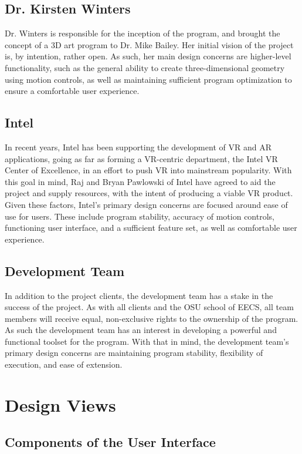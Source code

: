 \documentclass[onecolumn, draftclsnofoot,10pt, compsoc]{IEEEtran}
\begin{document}
\subsection{Dr. Kirsten Winters}
Dr. Winters is responsible for the inception of the program, and brought the concept of a 3D art program to Dr. Mike Bailey. Her initial vision of the project is, by intention, rather open. As such, her main design concerns are higher-level functionality, such as the general ability to create three-dimensional geometry using motion controls, as well as maintaining sufficient program optimization to ensure a comfortable user experience.
\subsection{Intel}
In recent years, Intel has been supporting the development of VR and AR applications, going as far as forming a VR-centric department, the Intel VR Center of Excellence, in an effort to push VR into mainstream popularity. With this goal in mind, Raj and Bryan Pawlowski of Intel have agreed to aid the project and supply resources, with the intent of producing a viable VR product. Given these factors, Intel’s primary design concerns are focused around ease of use for users. These include program stability, accuracy of motion controls, functioning user interface, and a sufficient feature set, as well as comfortable user experience. 
\subsection{Development Team}
In addition to the project clients, the development team has a stake in the success of the project. As with all clients and the OSU school of EECS, all team members will receive equal, non-exclusive rights to the ownership of the program. As such the development team has an interest in developing a powerful and functional toolset for the program. With that in mind, the development team’s primary design concerns are maintaining program stability, flexibility of execution, and ease of extension.

\section{Design Views}


\subsection{Components of the User Interface}
\end{document}
